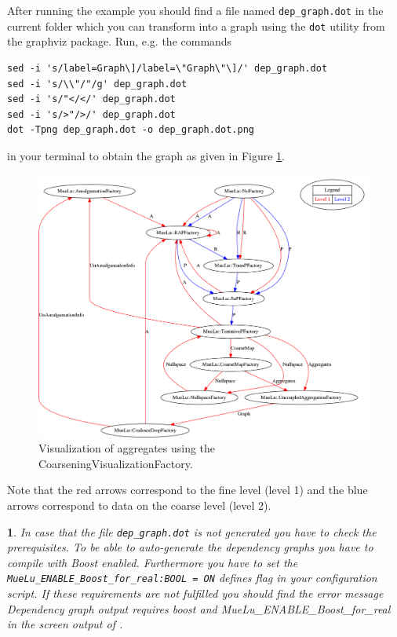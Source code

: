 \documentclass[10pt,fleqn]{book}
\newtheorem*{mycomment}{\ding{42}}
\begin{document}
After running the example you should find a file named \verb|dep_graph.dot| in the current folder which you can transform into a graph using the \verb|dot| utility from the graphviz package.
Run, e.g. the commands
\begin{verbatim}
sed -i 's/label=Graph\]/label=\"Graph\"\]/' dep_graph.dot
sed -i 's/\\"/"/g' dep_graph.dot
sed -i 's/"</</' dep_graph.dot
sed -i 's/>"/>/' dep_graph.dot
dot -Tpng dep_graph.dot -o dep_graph.dot.png
\end{verbatim}
in your terminal to obtain the graph as given in Figure \ref{fig:autograph}.
\begin{figure}
\begin{center}
\includegraphics[width=1.0\textwidth]{pics/dep_graph}
\end{center}
\caption{Visualization of aggregates using the CoarseningVisualizationFactory.}
\label{fig:autograph}
\end{figure}

Note that the red arrows correspond to the fine level (level 1) and the blue arrows correspond to data on the coarse level (level 2).

\begin{mycomment}
In case that the file \verb|dep_graph.dot| is not generated you have to check the prerequisites. To be able to auto-generate the dependency graphs you have to compile \muelu with Boost enabled. Furthermore you have to set the \verb|MueLu_ENABLE_Boost_for_real:BOOL = ON| defines flag in your configuration script. If these requirements are not fulfilled you should find the error message \textit{Dependency graph output requires boost and MueLu\_ENABLE\_Boost\_for\_real} in the screen output of \muelu.
\end{mycomment}
\end{document}
